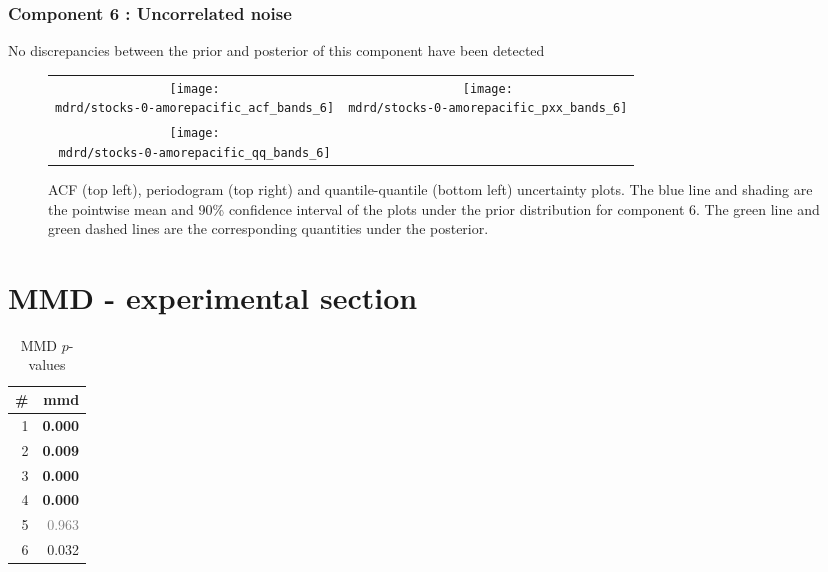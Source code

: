\documentclass{article} %
\begin{document}
\subsubsection{Component 6 : Uncorrelated noise}

No discrepancies between the prior and posterior of this component have been detected

\begin{figure}[H]
\newcommand{\wmgd}{0.5\columnwidth}
\newcommand{\hmgd}{3.0cm}
\newcommand{\mdrd}{stocks-0-amorepacific}
\newcommand{\mbm}{\hspace{-0.3cm}}
\begin{tabular}{cc}
\mbm \texttt{[image: \\mdrd/stocks-0-amorepacific\_acf\_bands\_6]} & \texttt{[image: \\mdrd/stocks-0-amorepacific\_pxx\_bands\_6]} \\
\mbm \texttt{[image: \\mdrd/stocks-0-amorepacific\_qq\_bands\_6]}
\end{tabular}
\caption{
ACF (top left), periodogram (top right) and quantile-quantile (bottom left) uncertainty plots.
The blue line and shading are the pointwise mean and 90\% confidence interval of the plots under the prior distribution for component 6.
The green line and green dashed lines are the corresponding quantities under the posterior.}
\label{fig:check6}
\end{figure}

\section{MMD - experimental section}
\label{sec:mmd}

\begin{table}[htb]
\begin{center}
{\small
\begin{tabular}{|r|r|}
\hline
\bf{\#} & {mmd}\\
\hline

1 & \textbf{0.000}\\

2 & \textbf{0.009}\\

3 & \textbf{0.000}\\

4 & \textbf{0.000}\\

5 & \textcolor{gray}{0.963}\\

6 & 0.032\\

\hline
\end{tabular}
\caption{
MMD $p$-values
}
\label{table:mmd}
}
\end{center}
\end{table}
\end{document}
